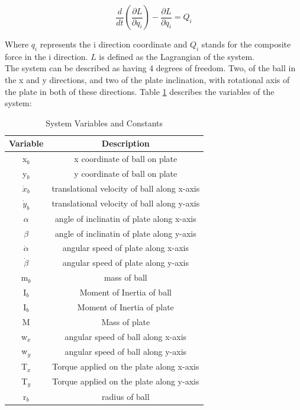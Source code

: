 \documentclass[conference]{IEEEtran}
\begin{document}
\begin{equation}
\frac{d}{dt}\left(\frac{\partial L}{\partial q_{i}}\right) - \frac{\partial L}{\partial q_{i}} = Q_{i}\label{eq1}
\end{equation}

Where $q_{i}$ represents the i direction coordinate and $Q_{i}$ stands for the composite force in the i direction. $L$ is defined as the Lagrangian of the system.
\\The system can be described as having 4 degrees of freedom. Two, of the ball in the x and y directions, and two of the plate inclination, with rotational axis of the plate in both of these directions. Table \ref{table1} describes the variables of the system:

\begin{table}[h!]
\caption{System Variables and Constants}
\begin{center}
\begin{tabular}{| c | c |}
 \hline
 Variable & Description \\
\hline
x$_{b}$  & x coordinate of ball on plate \\
\hline
y$_{b}$  & y coordinate of ball on plate  \\
\hline
$\dot x_{b}$  & translational velocity of ball along x-axis  \\
\hline
$\dot y_{b}$  & translational velocity of ball along y-axis  \\
\hline
$\alpha$ & angle of inclinatin of plate along x-axis  \\
\hline
 $\beta$  &  angle of inclinatin of plate along y-axis\\
\hline
$\dot \alpha$ & angular speed of plate along x-axis  \\
\hline
 $\dot \beta$ & angular speed of plate along y-axis  \\
\hline
m$_{b}$  & mass of ball \\
\hline
 I$_{b}$  & Moment of Inertia of ball  \\
\hline
 I$_{b}$  & Moment of Inertia of plate  \\
\hline
 M  & Mass of plate \\
\hline
 w$_{x}$  & angular speed of ball along x-axis  \\
\hline
 w$_{y}$  & angular speed of ball along y-axis  \\
\hline
 T$_{x}$ & Torque applied on the plate along x-axis  \\
\hline
 T$_{y}$  & Torque applied on the plate along y-axis \\
\hline
 r$_{b}$ & radius of ball \\
\hline
\end{tabular}\label{table1}
\end{center}
\end{table}
\end{document}
